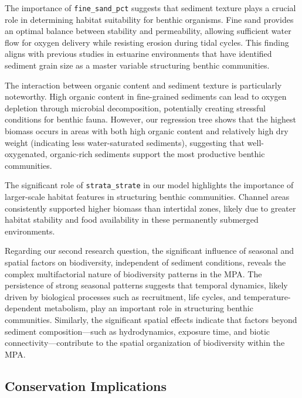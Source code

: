 \documentclass[12pt]{article}
\begin{document}
{\qquad The importance of \texttt{fine\_sand\_pct} suggests that sediment texture
plays a crucial role in determining habitat suitability for benthic organisms.
Fine sand provides an optimal balance between stability and permeability,
allowing sufficient water flow for oxygen delivery while resisting erosion
during tidal cycles. This finding aligns with previous studies in estuarine
environments that have identified sediment grain size as a master variable
structuring benthic communities\cite{glud2008oxygen}.

\qquad The interaction between organic content and sediment texture is
particularly noteworthy. High organic content in fine-grained sediments can lead
to oxygen depletion through microbial decomposition, potentially creating
stressful conditions for benthic fauna. However, our regression tree shows that
the highest biomass occurs in areas with both high organic content and
relatively high dry weight (indicating less water-saturated sediments),
suggesting that well-oxygenated, organic-rich sediments support the most
productive benthic communities.

\qquad The significant role of \texttt{strata\_strate} in our model highlights
the importance of larger-scale habitat features in structuring benthic
communities. Channel areas consistently supported higher biomass than intertidal
zones, likely due to greater habitat stability and food availability in these
permanently submerged environments.

\qquad Regarding our second research question, the significant influence of
seasonal and spatial factors on biodiversity, independent of sediment
conditions, reveals the complex multifactorial nature of biodiversity patterns
in the MPA. The persistence of strong seasonal patterns suggests that temporal
dynamics, likely driven by biological processes such as recruitment, life
cycles, and temperature-dependent metabolism, play an important role in
structuring benthic communities. Similarly, the significant spatial effects
indicate that factors beyond sediment composition—such as hydrodynamics,
exposure time, and biotic connectivity—contribute to the spatial organization of
biodiversity within the MPA.

\subsection{Conservation Implications}

}
\end{document}
